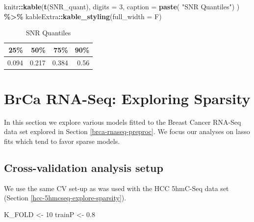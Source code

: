 \documentclass[
]{book}
\newenvironment{Shaded}{\begin{snugshade}}{\end{snugshade}}
\newcommand{\DataTypeTok}[1]{\textcolor[rgb]{0.13,0.29,0.53}{#1}}
\newcommand{\DecValTok}[1]{\textcolor[rgb]{0.00,0.00,0.81}{#1}}
\newcommand{\FloatTok}[1]{\textcolor[rgb]{0.00,0.00,0.81}{#1}}
\newcommand{\KeywordTok}[1]{\textcolor[rgb]{0.13,0.29,0.53}{\textbf{#1}}}
\newcommand{\NormalTok}[1]{#1}
\newcommand{\OperatorTok}[1]{\textcolor[rgb]{0.81,0.36,0.00}{\textbf{#1}}}
\newcommand{\StringTok}[1]{\textcolor[rgb]{0.31,0.60,0.02}{#1}}
\begin{document}
\begin{Shaded}
\begin{Highlighting}[]
\NormalTok{knitr}\OperatorTok{::}\KeywordTok{kable}\NormalTok{(}\KeywordTok{t}\NormalTok{(SNR\_quant),}
  \DataTypeTok{digits =} \DecValTok{3}\NormalTok{,}
  \DataTypeTok{caption =} \KeywordTok{paste}\NormalTok{(}
    \StringTok{"SNR Quantiles"}\NormalTok{) }
\NormalTok{) }\OperatorTok{\%>\%}\StringTok{ }\NormalTok{kableExtra}\OperatorTok{::}\KeywordTok{kable\_styling}\NormalTok{(}\DataTypeTok{full\_width =}\NormalTok{ F)}
\end{Highlighting}
\end{Shaded}

\begin{table}

\caption{\label{tab:brcaRna-preproc-plotSNR}SNR Quantiles}
\centering
\begin{tabular}[t]{r|r|r|r}
\hline
25\% & 50\% & 75\% & 90\%\\
\hline
0.094 & 0.217 & 0.384 & 0.56\\
\hline
\end{tabular}
\end{table}

\hypertarget{brca-rnaseseq-explore-sparsity}{%
\chapter{BrCa RNA-Seq: Exploring Sparsity}\label{brca-rnaseseq-explore-sparsity}}

In this section we explore various models fitted to
the Breast Cancer RNA-Seq data set explored in Section \ref{brca-rnaseq-preproc}.
We focus our analyses on lasso fits which tend to favor sparse models.

\hypertarget{cross-validation-analysis-setup-1}{%
\section{Cross-validation analysis setup}\label{cross-validation-analysis-setup-1}}

We use the same CV set-up as was used with the HCC 5hmC-Seq data set
(Section \ref{hcc-5hmcseq-explore-sparsity}).

\begin{Shaded}
\begin{Highlighting}[]
\NormalTok{K\_FOLD <{-}}\StringTok{ }\DecValTok{10}
\NormalTok{trainP <{-}}\StringTok{ }\FloatTok{0.8}
\end{Highlighting}
\end{Shaded}
\end{document}
